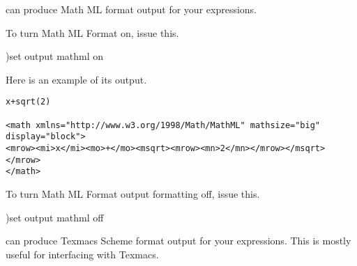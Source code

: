 
\Language{} can
produce Math ML format output for your
expressions.

\begin{noOutputXtc}
\begin{xtccomment}
To turn Math ML Format on, issue this.
\end{xtccomment}
\begin{spadsrc}
)set output mathml on
\end{spadsrc}
\end{noOutputXtc}
Here is an example of its output.
\begin{verbatim}
x+sqrt(2)

<math xmlns="http://www.w3.org/1998/Math/MathML" mathsize="big" display="block">
<mrow><mi>x</mi><mo>+</mo><msqrt><mrow><mn>2</mn></mrow></msqrt></mrow>
</math>
\end{verbatim}
\begin{noOutputXtc}
\begin{xtccomment}
To turn Math ML Format output formatting off, issue this.
\end{xtccomment}
\begin{spadsrc}
)set output mathml off
\end{spadsrc}
\end{noOutputXtc}
%

\Language{} can
produce Texmacs Scheme format output for your
expressions.  This is mostly useful for interfacing with Texmacs.

